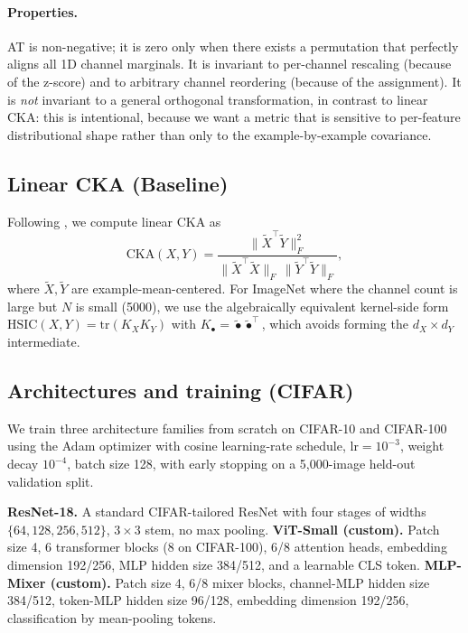 \documentclass[11pt]{article}
\begin{document}
\paragraph{Properties.} AT is non-negative; it is zero only when there
exists a permutation that perfectly aligns all 1D channel marginals. It
is invariant to per-channel rescaling (because of the z-score) and to
arbitrary channel reordering (because of the assignment). It is
\emph{not} invariant to a general orthogonal transformation, in
contrast to linear CKA: this is intentional, because we want a metric
that is sensitive to per-feature distributional shape rather than only
to the example-by-example covariance.

\subsection{Linear CKA (Baseline)}

Following \citet{kornblith2019similarity}, we compute linear CKA as
\begin{equation}
\mathrm{CKA}(X, Y) =
\frac{\| \tilde{X}^\top \tilde{Y} \|_F^2}
     {\| \tilde{X}^\top \tilde{X} \|_F\, \| \tilde{Y}^\top \tilde{Y} \|_F},
\end{equation}
where $\tilde{X}, \tilde{Y}$ are example-mean-centered. For ImageNet
where the channel count is large but $N$ is small (5000), we use the
algebraically equivalent kernel-side form
$\mathrm{HSIC}(X, Y) = \mathrm{tr}(K_X K_Y)$ with $K_\bullet = \tilde{\bullet} \tilde{\bullet}^\top$,
which avoids forming the $d_X \times d_Y$ intermediate.

\subsection{Architectures and training (CIFAR)}

We train three architecture families from scratch on CIFAR-10 and
CIFAR-100 using the Adam optimizer with cosine learning-rate schedule,
$\mathrm{lr} = 10^{-3}$, weight decay $10^{-4}$, batch size 128, with
early stopping on a 5{,}000-image held-out validation split.

\textbf{ResNet-18.} A standard CIFAR-tailored ResNet with four stages
of widths $\{64, 128, 256, 512\}$, $3\times3$ stem, no max pooling.
\textbf{ViT-Small (custom).} Patch size 4, 6 transformer blocks (8 on
CIFAR-100), 6/8 attention heads, embedding dimension 192/256, MLP
hidden size 384/512, and a learnable CLS token. \textbf{MLP-Mixer
(custom).} Patch size 4, 6/8 mixer blocks, channel-MLP hidden size
384/512, token-MLP hidden size 96/128, embedding dimension 192/256,
classification by mean-pooling tokens.
\end{document}

